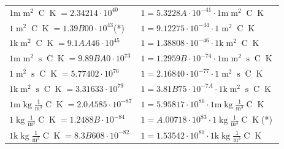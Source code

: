 \begin{center}
\begin{longtable}{l l}
{\color{gray}$1 \bm{\mathrm{ m}}{\operatorname{m}^2}{}{\operatorname{C}}{\operatorname{K}} = 2.34214\cdot10^{40} $}   & {\color{gray}$ 1 = 5.3228A\cdot10^{-41} \cdot 1 \bm{\mathrm{ m}}{\operatorname{m}^2}{}{\operatorname{C}}{\operatorname{K}}$}  \\
{\color{black}$1 \bm{\mathrm{ }}{\operatorname{m}^2}{}{\operatorname{C}}{\operatorname{K}} = 1.39B00\cdot10^{43} $}\quad(*) & {\color{black}$ 1 = 9.12275\cdot10^{-44} \cdot 1 \bm{\mathrm{ }}{\operatorname{m}^2}{}{\operatorname{C}}{\operatorname{K}}$}  \\
{\color{gray}$1 \bm{\mathrm{ k}}{\operatorname{m}^2}{}{\operatorname{C}}{\operatorname{K}} = 9.1AA46\cdot10^{45} $}   & {\color{gray}$ 1 = 1.38808\cdot10^{-46} \cdot 1 \bm{\mathrm{ k}}{\operatorname{m}^2}{}{\operatorname{C}}{\operatorname{K}}$}  \\
{\color{gray}$1 \bm{\mathrm{ m}}{\operatorname{m}^2}{\operatorname{s}}{\operatorname{C}}{\operatorname{K}} = 9.89BA0\cdot10^{73} $}   & {\color{gray}$ 1 = 1.2959B\cdot10^{-74} \cdot 1 \bm{\mathrm{ m}}{\operatorname{m}^2}{\operatorname{s}}{\operatorname{C}}{\operatorname{K}}$}  \\
{\color{black}$1 \bm{\mathrm{ }}{\operatorname{m}^2}{\operatorname{s}}{\operatorname{C}}{\operatorname{K}} = 5.77402\cdot10^{76} $}   & {\color{black}$ 1 = 2.16840\cdot10^{-77} \cdot 1 \bm{\mathrm{ }}{\operatorname{m}^2}{\operatorname{s}}{\operatorname{C}}{\operatorname{K}}$}  \\
{\color{gray}$1 \bm{\mathrm{ k}}{\operatorname{m}^2}{\operatorname{s}}{\operatorname{C}}{\operatorname{K}} = 3.31633\cdot10^{79} $}   & {\color{gray}$ 1 = 3.81B75\cdot10^{-7A} \cdot 1 \bm{\mathrm{ k}}{\operatorname{m}^2}{\operatorname{s}}{\operatorname{C}}{\operatorname{K}}$}  \\
\hline{\color{gray}$1 \bm{\mathrm{ m}}\operatorname{kg}\frac1{\operatorname{m}^3}{}{\operatorname{C}}{\operatorname{K}} = 2.0A585\cdot10^{-87} $}   & {\color{gray}$ 1 = 5.95817\cdot10^{86} \cdot 1 \bm{\mathrm{ m}}\operatorname{kg}\frac1{\operatorname{m}^3}{}{\operatorname{C}}{\operatorname{K}}$}  \\
{\color{black}$1 \bm{\mathrm{ }}\operatorname{kg}\frac1{\operatorname{m}^3}{}{\operatorname{C}}{\operatorname{K}} = 1.2488B\cdot10^{-84} $}   & {\color{black}$ 1 = A.00718\cdot10^{83} \cdot 1 \bm{\mathrm{ }}\operatorname{kg}\frac1{\operatorname{m}^3}{}{\operatorname{C}}{\operatorname{K}}$}\quad(*)\\
{\color{gray}$1 \bm{\mathrm{ k}}\operatorname{kg}\frac1{\operatorname{m}^3}{}{\operatorname{C}}{\operatorname{K}} = 8.3B608\cdot10^{-82} $}   & {\color{gray}$ 1 = 1.53542\cdot10^{81} \cdot 1 \bm{\mathrm{ k}}\operatorname{kg}\frac1{\operatorname{m}^3}{}{\operatorname{C}}{\operatorname{K}}$}  \\

\end{longtable}
\end{center}
